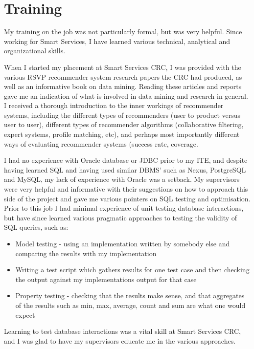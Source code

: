\documentclass{report}
\begin{document}
\chapter{Training}
My training on the job was not particularly formal, but was very helpful. Since working for Smart Services, I have learned various technical, analytical and organizational skills.

When I started my placement at Smart Services CRC, I was provided with the various RSVP recommender system research papers the CRC had produced, as well as an informative book on data mining. Reading these articles and reports gave me an indication of what is involved in data mining and research in general. I received a thorough introduction to the inner workings of recommender systems, including the different types of recommenders (user to product versus user to user), different types of recommender algorithms (collaborative filtering, expert systems, profile matching, etc), and perhaps most importantly different ways of evaluating recommender systems (success rate, coverage.

I had no experience with Oracle database or JDBC prior to my ITE, and despite having learned SQL and having used similar DBMS' such as Nexus, PostgreSQL and MySQL, my lack of experience with Oracle was a setback. My supervisors were very helpful and informative with their suggestions on how to approach this side of the project and gave me various pointers on SQL testing and optimisation. Prior to this job I had minimal experience of unit testing database interactions, but have since learned various pragmatic approaches to testing the validity of SQL queries, such as:
\begin{itemize}
  \item Model testing - using an implementation written by somebody else and comparing the results with my implementation
  \item Writing a test script which gathers results for one test case and then checking the output against my implementations output for that case
  \item Property testing - checking that the results make sense, and that aggregates of the results such as min, max, average, count and sum are what one would expect
\end{itemize}

Learning to test database interactions was a vital skill at Smart Services CRC, and I was glad to have my supervisors educate me in the various approaches.
\end{document}
